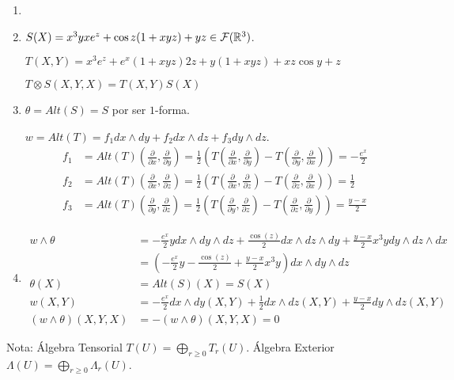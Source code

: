 \documentclass[twoside]{article}
\begin{document}
\begin{solucion}
\begin{enumerate}
\item[]
\item $S(X)=x^3yxe^z+\cos{z}(1+xyz)+yz\in\mathcal{F}(\mathbb{R}^3)$. 

$T(X,Y)=x^3e^z+e^x(1+xyz)2z+y(1+xyz)+xz\cos{y}+z$

$T\otimes S(X,Y,X)=T(X,Y)S(X)$
\item $\theta=Alt(S)=S$ por ser $1$-forma. 

$w= Alt(T)=f_1dx\land dy+f_2 dx\land dz + f_3 dy\land dz$.
\begin{align*}
f_1 &= Alt(T)\left(\frac{\partial}{\partial x},\frac{\partial}{\partial y}\right)=\frac{1}{2}\left(T\left(\frac{\partial}{\partial x},\frac{\partial}{\partial y}\right)-T\left(\frac{\partial}{\partial y},\frac{\partial}{\partial x}\right)\right)=-\frac{e^x}{2}\\
f_2 &= Alt(T)\left(\frac{\partial}{\partial x},\frac{\partial}{\partial z}\right)=\frac{1}{2}\left(T\left(\frac{\partial}{\partial x},\frac{\partial}{\partial z}\right)-T\left(\frac{\partial}{\partial z},\frac{\partial}{\partial x}\right)\right)=\frac{1}{2}\\
f_3 &= Alt(T)\left(\frac{\partial}{\partial y},\frac{\partial}{\partial z}\right)=\frac{1}{2}\left(T\left(\frac{\partial}{\partial y},\frac{\partial}{\partial z}\right)-T\left(\frac{\partial}{\partial z},\frac{\partial}{\partial y}\right)\right)=\frac{y-x}{2}
\end{align*}
\item 
\begin{align*}
w\land \theta &= -\frac{e^x}{2}y  dx\land dy \land dz +\frac{\cos(z)}{2}dx\land dz \land dy + \frac{y-x}{2}x^3 y dy\land dz \land dx\\
&=\left(-\frac{e^x}{2}y  -\frac{\cos(z)}{2} +  \frac{y-x}{2}x^3 y \right)dx\land dy \land dz\\
\theta(X)&=Alt(S)(X)=S(X)\\
w(X,Y)&= -\frac{e^x}{2}dx\land dy (X,Y) + \frac{1}{2} dx\land dz (X,Y) + \frac{y-x}{2} dy\land dz(X,Y)\\
(w\land \theta)(X,Y,X) & = -(w\land \theta)(X,Y,X) = 0
\end{align*}
\end{enumerate}
Nota: Álgebra Tensorial $T(U)=\bigoplus_{r\geq 0}T_r(U)$. Álgebra Exterior $\Lambda(U)=\bigoplus_{r\geq 0} \Lambda_r(U)$.
\end{solucion}

\newpage
\end{document}
